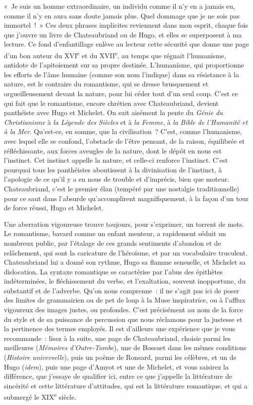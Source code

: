 \documentclass[french,twoside]{book} %
\begin{document}
« Je suis un homme extraordinaire, un individu comme il n’y en a jamais eu, comme il n’y en aura sans doute jamais plus. Quel dommage que je ne sois pas immortel ! » Ces deux phrases implicites reviennent dans mon esprit, chaque fois que j’ouvre un livre de Chateaubriand ou de Hugo, et elles se superposent à ma lecture. Ce fond d’enfantillage enlève au lecteur cette sécurité que donne une page d’un bon auteur du XVI\textsuperscript{e} et du XVII\textsuperscript{e}, au temps que régnait l’humanisme, antidote de l’apitoiement sur sa propre destinée. L’humanisme, qui proportionne les efforts de l’âme humaine (comme son nom l’indique) dans sa résistance à la nature, est le contraire du romantisme, qui se dresse brusquement et orgueilleusement devant la nature, pour lui céder tout d’un seul coup. C’est ce qui fait que le romantisme, encore chrétien avec Chateaubriand, devient panthéiste avec Hugo et Michelet. On suit aisément la pente du {\itshape Génie du Christianisme} à {\itshape la Légende des Siècles} et à {\itshape la Femme}, à {\itshape la Bible de l’Humanité et à la Mer}. Qu’est-ce, en somme, que la civilisation ? C’est, comme l’humanisme, avec lequel elle se confond, l’obstacle de l’être pensant, de la raison, équilibrée et réfléchissante, aux forces aveugles de la nature, dont le dépôt en nous est l’instinct. Cet instinct appelle la nature, et celle-ci renforce l’instinct. C’est pourquoi tous les panthéistes aboutissent à la divinisation de l’instinct, à l’apologie de ce qu’il y a en nous de trouble et d’imprécis, bien que moteur. Chateaubriand, c’est le premier élan (tempéré par une nostalgie traditionnelle) pour ce saut dans l’absurde qu’accomplirent magnifiquement, à la façon d’un tour de force réussi, Hugo et Michelet.\par
Une aberration vigoureuse trouve toujours, pour s’exprimer, un torrent de mots. Le romantisme, bavard comme un enfant menteur, a rapidement séduit un nombreux public, par l’étalage de ces grands sentiments d’abandon et de relâchement, qui sont la caricature de l’héroïsme, et par un vocabulaire truculent. Chateaubriand lui a donné son rythme, Hugo sa flamme sensuelle, et Michelet sa dislocation. La syntaxe romantique se caractérise par l’abus des épithètes indéterminées, le fléchissement du verbe, et l’exaltation, souvent inopportune, du substantif et de l’adverbe. Qu’on nous comprenne : il ne s’agit pas ici de poser des limites de grammairien ou de pet de loup à la Muse inspiratrice, ou à l’afflux vigoureux des images justes, ou profondes. C’est précisément au nom de la force du style et de sa puissance de percussion que nous réclamons pour la justesse et la pertinence des termes employés. Il est d’ailleurs une expérience que je vous recommande : lisez à la suite, une page de Chateaubriand, choisie parmi les meilleures ({\itshape Mémoires d’Outre-Tombe}), une de Bossuet dans les mêmes conditions ({\itshape Histoire universelle}), puis un poème de Ronsard, parmi les célèbres, et un de Hugo ({\itshape idem}), puis une page d’Amyot et une de Michelet, et vous saisirez la différence, que j’essaye de qualifier ici, entre ce que j’appelle la littérature de sincérité et cette littérature d’attitudes, qui est la littérature romantique, et qui a submergé le XIX\textsuperscript{e} siècle.\par
\end{document}
